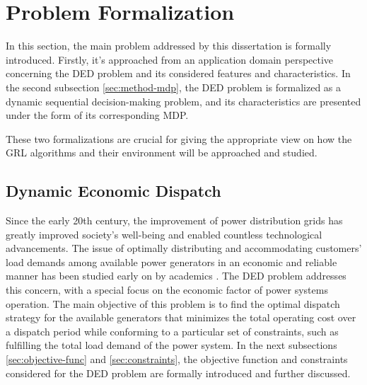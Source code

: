 \section{Problem Formalization} \label{sec:method-formal}

In this section, the main problem addressed by this dissertation is formally introduced. Firstly, it's approached from an application domain perspective concerning the \ac{DED} problem and its considered features and characteristics. In the second subsection \ref{sec:method-mdp}, the \ac{DED} problem is formalized as a dynamic sequential decision-making problem, and its characteristics are presented under the form of its corresponding \ac{MDP}. \par
These two formalizations are crucial for giving the appropriate view on how the \ac{GRL} algorithms and their environment will be approached and studied.

\subsection{Dynamic Economic Dispatch} \label{sec:method-ded}

Since the early 20th century, the improvement of power distribution grids has greatly improved society's well-being and enabled countless technological advancements. The issue of optimally distributing and accommodating customers' load demands among available power generators in an economic and reliable manner has been studied early on by academics \cite{xiaOptimalDynamicEconomic2010}. The \acf{DED} problem addresses this concern, with a special focus on the economic factor of power systems operation. The main objective of this problem is to find the optimal dispatch strategy for the available generators that minimizes the total operating cost over a dispatch period while conforming to a particular set of constraints, such as fulfilling the total load demand of the power system. In the next subsections \ref{sec:objective-func} and \ref{sec:constraints}, the objective function and constraints considered for the \ac{DED} problem are formally introduced and further discussed.

